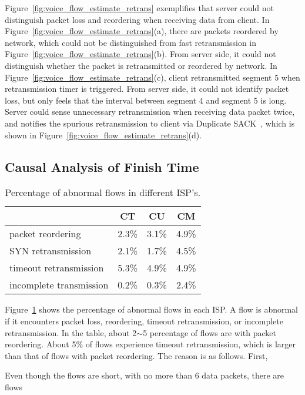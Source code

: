 Figure~\ref{fig:voice_flow_estimate_retrans} exemplifies that server could not distinguish packet loss and reordering when receiving data from client. In Figure~\ref{fig:voice_flow_estimate_retrans}(a), there are packets reordered by network, which could not be distinguished from fast retransmission in Figure~\ref{fig:voice_flow_estimate_retrans}(b). From server side, it could not distinguish whether the packet is retransmitted or reordered by network. In Figure~\ref{fig:voice_flow_estimate_retrans}(c), client retransmitted segment 5 when retransmission timer is triggered. From server side, it could not identify packet loss, but only feels that the interval between segment 4 and segment 5 is long. Server could sense unnecessary retransmission when receiving data packet twice, and notifies the spurious retransmission to client via Duplicate SACK~\cite{rfc3078}, which is shown in Figure~\ref{fig:voice_flow_estimate_retrans}(d).

\subsection{Causal Analysis of Finish Time}

\begin{table}[th]
\centering
\renewcommand{\arraystretch}{1.2}
\caption{Percentage of abnormal flows in different ISP's.}
\label{tab:voice_stats}
\begin{tabular}{l|c|c|c}
	\toprule
	 & CT & CU & CM \\
	\midrule
	packet reordering & 2.3\% & 3.1\% & 4.9\% \\
	\hline
	SYN retransmission & 2.1\% & 1.7\% & 4.5\% \\
	\hline
	timeout retransmission & 5.3\% & 4.9\% & 4.9\% \\
	\hline
	incomplete transmission & 0.2\% & 0.3\% & 2.4\% \\
	\bottomrule
\end{tabular}
\end{table}

Figure~\ref{tab:voice_stats} shows the percentage of abnormal flows in each ISP. A flow is abnormal if it encounters packet loss, reordering, timeout retransmission, or incomplete retransmission. In the table, about 2$\sim$5 percentage of flows are with packet reordering. About 5\% of flows experience timeout retransmission, which is larger than that of flows with packet reordering. The reason is as follows. First, 

Even though the flows are short, with no more than 6 data packets, there are flows 

